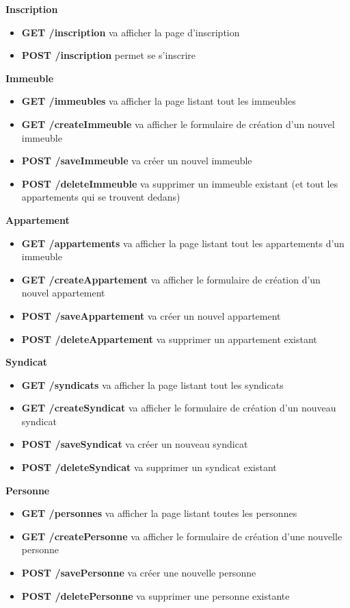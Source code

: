 \documentclass[french]{article}
\begin{document}
\noindent \textbf{Inscription}
\begin{itemize}
\item \textbf{GET /inscription} va afficher la page d'inscription
\item \textbf{POST /inscription} permet se s'inscrire \\
\end{itemize}

\noindent \textbf{Immeuble}
\begin{itemize}
\item \textbf{GET /immeubles} va afficher la page listant tout les immeubles
\item \textbf{GET /createImmeuble} va afficher le formulaire de création d'un nouvel immeuble
\item \textbf{POST /saveImmeuble} va créer un nouvel immeuble
\item \textbf{POST /deleteImmeuble} va supprimer un immeuble existant (et tout les appartements qui se trouvent dedans) \\
\end{itemize}

\noindent \textbf{Appartement}
\begin{itemize}
\item \textbf{GET /appartements} va afficher la page listant tout les appartements d'un immeuble
\item \textbf{GET /createAppartement} va afficher le formulaire de création d'un nouvel appartement
\item \textbf{POST /saveAppartement} va créer un nouvel appartement
\item \textbf{POST /deleteAppartement} va supprimer un appartement existant \\
\end{itemize}

\noindent \textbf{Syndicat}
\begin{itemize}
\item \textbf{GET /syndicats} va afficher la page listant tout les syndicats
\item \textbf{GET /createSyndicat} va afficher le formulaire de création d'un nouveau syndicat
\item \textbf{POST /saveSyndicat} va créer un nouveau syndicat
\item \textbf{POST /deleteSyndicat} va supprimer un syndicat existant \\
\end{itemize}

\noindent \textbf{Personne}
\begin{itemize}
\item \textbf{GET /personnes} va afficher la page listant toutes les personnes
\item \textbf{GET /createPersonne} va afficher le formulaire de création d'une nouvelle personne
\item \textbf{POST /savePersonne} va créer une nouvelle personne
\item \textbf{POST /deletePersonne} va supprimer une personne existante \\
\end{itemize}
\end{document}
